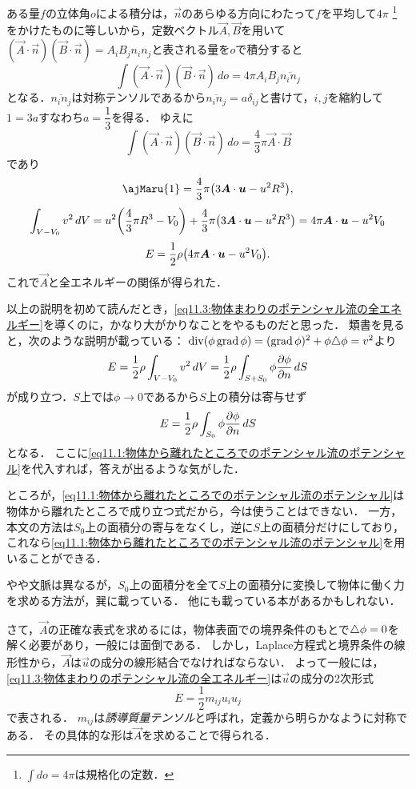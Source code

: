 ある量$f$の立体角$o$による積分は，$\vec{n}$のあらゆる方向にわたって$f$を平均して$4\pi$
\footnote{$\displaystyle \int do = 4\pi$は規格化の定数．}
をかけたものに等しいから，定数ベクトル$\vec{A},\vec{B}$を用いて$(\vec{A}\cdot\vec{n})(\vec{B}\cdot\vec{n}) = A_iB_jn_in_j$と表される量を$o$で積分すると
\[
    \int (\vec{A}\cdot\vec{n})(\vec{B}\cdot\vec{n}) \, do = 4\pi A_iB_j \overline{n_in_j}
\]
となる．$\overline{n_in_j}$は対称テンソルであるから$\overline{n_in_j}=a \delta_{ij}$と書けて，$i,j$を縮約して$1=3a$すなわち$a=\dfrac{1}{3}$を得る．
ゆえに
\[
    \int (\vec{A}\cdot\vec{n})(\vec{B}\cdot\vec{n}) \, do = \frac{4}{3}\pi \vec{A}\cdot\vec{B}
\]
であり
\[
    \text{\ajMaru{1}} = \frac{4}{3}\pi \pqty{ 3\vec{A}\cdot\vec{u} -u^2R^3 } ,
\]
\[
    \int_{V-V_0} v^2 \dV = u^2 \pqty{ \frac{4}{3}\pi R^3 -V_0 } + \frac{4}{3}\pi \pqty{ 3\vec{A}\cdot\vec{u} -u^2R^3 }
    = 4\pi \vec{A}\cdot\vec{u} -u^2 V_0
\]
\begin{equation}\label{eq11.3:物体まわりのポテンシャル流の全エネルギー}
    E = \frac{1}{2} \rho\pqty{ 4\pi \vec{A}\cdot\vec{u} -u^2 V_0 } .
\end{equation}
これで$\vec{A}$と全エネルギーの関係が得られた．



\begin{details}
以上の説明を初めて読んだとき，\eqref{eq11.3:物体まわりのポテンシャル流の全エネルギー}を導くのに，かなり大がかりなことをやるものだと思った．
類書を見ると，次のような説明が載っている：
$\operatorname{div}(\phi\operatorname{grad}\phi) = (\operatorname{grad}\phi)^2 + \phi\triangle\phi = v^2$より
\[
    E = \frac{1}{2}\rho \int_{V-V_0} v^2 \, dV = \frac{1}{2}\rho \int_{S+S_0} \phi \pdv{\phi}{n} \, dS  
\]
が成り立つ．$S$上では$\phi\to0$であるから$S$上の積分は寄与せず
\[
    E = \frac{1}{2}\rho \int_{S_0} \phi \pdv{\phi}{n} \, dS
\]
となる．
ここに\eqref{eq11.1:物体から離れたところでのポテンシャル流のポテンシャル}を代入すれば，答えが出るような気がした．


ところが，\eqref{eq11.1:物体から離れたところでのポテンシャル流のポテンシャル}は物体から離れたところで成り立つ式だから，今は使うことはできない．
一方，本文の方法は$S_0$上の面積分の寄与をなくし，逆に$S$上の面積分だけにしており，
これなら\eqref{eq11.1:物体から離れたところでのポテンシャル流のポテンシャル}を用いることができる．

やや文脈は異なるが，$S_0$上の面積分を全て$S$上の面積分に変換して物体に働く力を求める方法が，巽に載っている．
他にも載っている本があるかもしれない．
\end{details}


さて，$\vec{A}$の正確な表式を求めるには，物体表面での境界条件のもとで$\triangle\phi=0$を解く必要があり，一般には面倒である．
しかし，Laplace方程式と境界条件の線形性から，$\vec{A}$は$\vec{u}$の成分の線形結合でなければならない．
よって一般には，\eqref{eq11.3:物体まわりのポテンシャル流の全エネルギー}は$\vec{u}$の成分の2次形式
\begin{equation}\label{eq11.4:流体の全エネルギーと誘導質量の関係}
    E = \frac{1}{2} m_{ij} u_i u_j
\end{equation}
で表される．
$m_{ij}$は\emph{誘導質量テンソル}と呼ばれ，定義から明らかなように対称である．
その具体的な形は$\vec{A}$を求めることで得られる．



